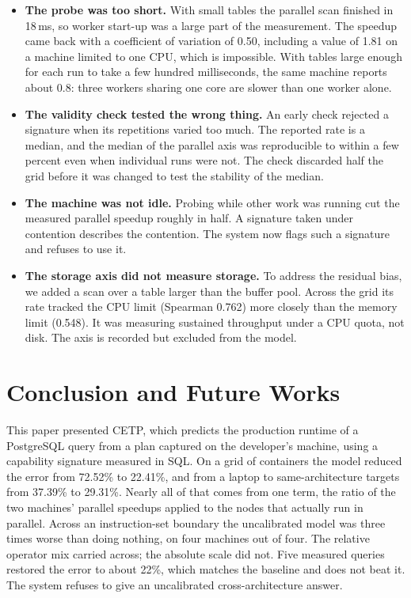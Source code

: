 \documentclass[runningheads]{llncs}
\begin{document}
\begin{itemize}
\item \textbf{The probe was too short.} With small tables the parallel scan
finished in 18\,ms, so worker start-up was a large part of the measurement.
The speedup came back with a coefficient of variation of 0.50, including a
value of 1.81 on a machine limited to one CPU, which is impossible. With
tables large enough for each run to take a few hundred milliseconds, the
same machine reports about 0.8: three workers sharing one core are slower
than one worker alone.
\item \textbf{The validity check tested the wrong thing.} An early check
rejected a signature when its repetitions varied too much. The reported rate
is a median, and the median of the parallel axis was reproducible to within
a few percent even when individual runs were not. The check discarded half
the grid before it was changed to test the stability of the median.
\item \textbf{The machine was not idle.} Probing while other work was running
cut the measured parallel speedup roughly in half. A signature taken under
contention describes the contention. The system now flags such a signature
and refuses to use it.
\item \textbf{The storage axis did not measure storage.} To address the
residual bias, we added a scan over a table larger than the buffer pool.
Across the grid its rate tracked the CPU limit (Spearman 0.762) more closely
than the memory limit (0.548). It was measuring sustained throughput under a
CPU quota, not disk. The axis is recorded but excluded from the model.
\end{itemize}

\section{Conclusion and Future Works}

This paper presented CETP, which predicts the production runtime of a
PostgreSQL query from a plan captured on the developer's machine, using a
capability signature measured in SQL. On a grid of containers the model
reduced the error from 72.52\% to 22.41\%, and from a laptop to
same-architecture targets from 37.39\% to 29.31\%. Nearly all of that comes
from one term, the ratio of the two machines' parallel speedups applied to
the nodes that actually run in parallel. Across an instruction-set boundary
the uncalibrated model was three times worse than doing nothing, on four
machines out of four. The relative operator mix carried across; the absolute
scale did not. Five measured queries restored the error to about 22\%, which
matches the baseline and does not beat it. The system refuses to give an
uncalibrated cross-architecture answer.
\end{document}
